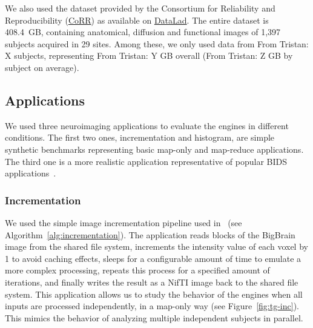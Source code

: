 \documentclass[conference]{IEEEtran}
\newcommand{\TG}[1]{\color{cyan}From Tristan: #1 \color{black}}
\begin{document}
We also used the dataset provided by the Consortium for Reliability and
Reproducibility
(\href{http://fcon_1000.projects.nitrc.org/indi/CoRR/html/}{CoRR}) as
available on
\href{http://datasets.datalad.org/?dir=/corr/RawDataBIDS}{DataLad}. The
entire dataset is 408.4~GB, containing anatomical, diffusion and functional
images of 1,397 subjects acquired in 29 sites. Among these, we only used
data from \TG{X} subjects, representing \TG{Y}GB overall (\TG{Z}GB by
subject on average).


\subsection{Applications}

We used three neuroimaging applications to evaluate the engines in
different conditions. The first two ones, incrementation and histogram, are
simple synthetic benchmarks representing basic map-only and map-reduce applications.
The third one is a more realistic application representative of popular
BIDS applications~\cite{gorgolewski2017bids}. 

\subsubsection{Incrementation}
We used the simple image incrementation pipeline used
in~\cite{hayot2019performance} (see Algorithm~\ref{alg:incrementation}).
The application reads blocks of the BigBrain image from the shared file
system, increments the intensity value of each voxel by 1 to avoid caching
effects, sleeps for a configurable amount of time to emulate a more complex
processing, repeats this process for a specified amount of iterations, and
finally writes the result as a NifTI image back to the shared file system.
This application allows us to study the behavior of the engines when all
inputs are processed independently, in a map-only way (see
Figure~\ref{fig:tg-inc}). This mimics the behavior of analyzing multiple
independent subjects in parallel.

\begin{algorithm}[!b]
    \caption{Incrementation (adapted from~\cite{hayot2019performance})}\label{alg:incrementation}
    \begin{algorithmic}
        \EndFor
    \EndFor
\end{algorithmic}
\end{algorithm}
\end{document}
